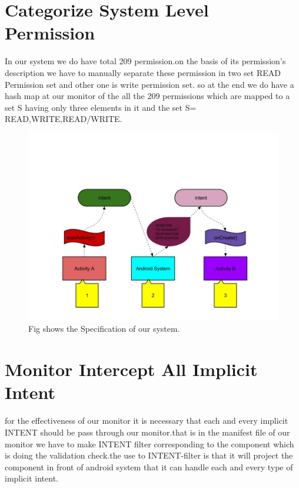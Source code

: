 \documentclass[11pt]{report}
\begin{document}
\section{Categorize System Level Permission}
In our system we do have total 209 permission.on the basis of its permission's description we have to manually separate these permission in two set 
READ Permission set and other one is write permission set.
so at the end we do have a hash map  at our monitor of the all the 209 permissions which are mapped to a set S having only three elements in it and the
set S= {READ,WRITE,READ/WRITE}.
  \begin{figure}[ht!]
\centering
\includegraphics[width=150mm]{./images/monitor.jpg}
\caption{ Fig shows the Specification of our system. \label{overflow}}
\end{figure}

\section{Monitor Intercept All Implicit Intent}
for the effectiveness of our monitor it is necessary that each and every implicit INTENT should be pass through our monitor.that is in the manifest file of 
our monitor we have to make INTENT filter corresponding to the component which is doing the validation check.the use to INTENT-filter is that it will project the component in front of 
android system that it can handle each and every type of implicit intent.
\end{document}
